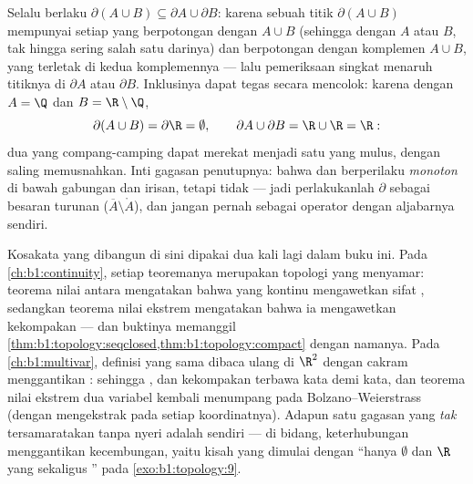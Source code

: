 \begin{example}\label{ex:b1:topology:boundaryunion}
Selalu berlaku $\partial(A \cup B) \subseteq \partial A \cup \partial
B$: karena sebuah titik $\partial(A \cup B)$ mempunyai setiap 
yang berpotongan dengan $A \cup B$ (sehingga dengan $A$ atau $B$, tak hingga sering salah satu
darinya) dan berpotongan dengan komplemen $A \cup B$, yang terletak di
kedua komplemennya --- lalu pemeriksaan singkat menaruh titiknya di
$\partial A$ atau $\partial B$. Inklusinya dapat tegas secara
mencolok: karena dengan $A = \Q$ dan $B = \R\setminus\Q$,
\[
\partial(A \cup B) = \partial \R = \emptyset ,
\qquad
\partial A \cup \partial B = \R \cup \R = \R :
\]
dua  yang compang-camping dapat merekat menjadi satu yang mulus, dengan 
saling memusnahkan. Inti gagasan penutupnya: bahwa  dan
 berperilaku \emph{monoton} di bawah gabungan dan
irisan, tetapi  tidak --- jadi perlakukanlah $\partial$ sebagai
besaran turunan ($\overline A \setminus \mathring A$), dan jangan pernah sebagai
operator dengan aljabarnya sendiri.
\end{example}

\begin{remark}
Kosakata yang dibangun di sini dipakai dua kali lagi dalam buku ini.
Pada \cref{ch:b1:continuity}, setiap teoremanya merupakan  topologi
yang menyamar: teorema nilai antara mengatakan bahwa
 yang kontinu mengawetkan sifat , sedangkan teorema nilai
ekstrem mengatakan bahwa ia mengawetkan kekompakan --- dan buktinya
memanggil \cref{thm:b1:topology:seqclosed,thm:b1:topology:compact}
dengan namanya. Pada \cref{ch:b1:multivar}, definisi yang sama
dibaca ulang di $\R^2$ dengan cakram menggantikan : sehingga ,
 dan kekompakan terbawa kata demi kata, dan
teorema nilai ekstrem dua variabel kembali menumpang pada
Bolzano--Weierstrass (dengan mengekstrak pada setiap koordinatnya). Adapun satu
gagasan yang \emph{tak} tersamaratakan tanpa nyeri adalah
 sendiri --- di bidang, keterhubungan menggantikan
kecembungan, yaitu kisah yang dimulai dengan
``hanya $\emptyset$ dan $\R$ yang  sekaligus '' pada
\cref{exo:b1:topology:9}.
\end{remark}

